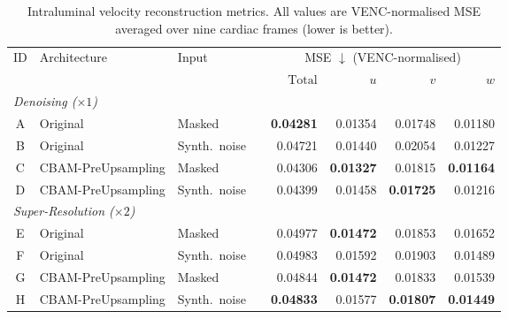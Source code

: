 \begin{table}[h!]
  \centering
  \caption{Intraluminal velocity reconstruction metrics.  All values are VENC-normalised MSE
  averaged over nine cardiac frames (lower is better).}
  \label{tab:velocity}
  \setlength{\tabcolsep}{5pt}
  \small
  \begin{tabular}{cll l rrrr}
    \toprule
    \multirow{2}{*}{ID} & \multirow{2}{*}{Architecture} & \multirow{2}{*}{Input} &
      & \multicolumn{4}{c}{MSE $\downarrow$ (VENC-normalised)} \\
    \cmidrule(lr){5-8}
    & & & & $\text{Total}$ & $u$ & $v$ & $w$ \\
    \midrule
    \multicolumn{8}{l}{\textit{Denoising ($\times 1$)}} \\
    \midrule
    A & Original           & Masked       & & \textbf{0.04281} & 0.01354 & 0.01748 & 0.01180 \\
    B & Original           & Synth.\ noise & & 0.04721 & 0.01440 & 0.02054 & 0.01227 \\
    C & CBAM-PreUpsampling & Masked       & & 0.04306 & \textbf{0.01327} & 0.01815 & \textbf{0.01164} \\
    D & CBAM-PreUpsampling & Synth.\ noise & & 0.04399 & 0.01458 & \textbf{0.01725} & 0.01216 \\
    \midrule
    \multicolumn{8}{l}{\textit{Super-Resolution ($\times 2$)}} \\
    \midrule
    E & Original           & Masked       & & 0.04977 & \textbf{0.01472} & 0.01853 & 0.01652 \\
    F & Original           & Synth.\ noise & & 0.04983 & 0.01592 & 0.01903 & 0.01489 \\
    G & CBAM-PreUpsampling & Masked       & & 0.04844 & \textbf{0.01472} & 0.01833 & 0.01539 \\
    H & CBAM-PreUpsampling & Synth.\ noise & & \textbf{0.04833} & 0.01577 & \textbf{0.01807} & \textbf{0.01449} \\
    \bottomrule
  \end{tabular}
\end{table}

